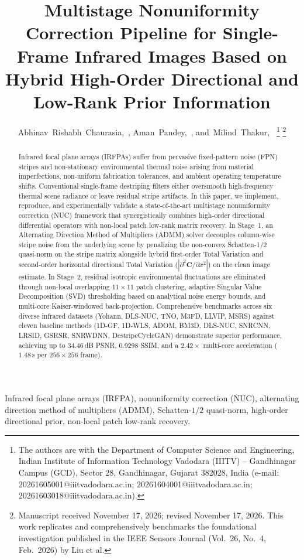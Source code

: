 \documentclass[journal]{IEEEtran}
\title{Multistage Nonuniformity Correction Pipeline for Single-Frame Infrared Images Based on Hybrid High-Order Directional and Low-Rank Prior Information}
\author{Abhinav~Rishabh~Chaurasia,~\IEEEmembership{Student Member,~IEEE},
        Aman~Pandey,~\IEEEmembership{Student Member,~IEEE},
        and~Milind~Thakur,~\IEEEmembership{Student Member,~IEEE}%
\thanks{The authors are with the Department of Computer Science and Engineering, Indian Institute of Information Technology Vadodara (IIITV) -- Gandhinagar Campus (GCD), Sector 28, Gandhinagar, Gujarat 382028, India (e-mail: 20261605001@iiitvadodara.ac.in; 20261604001@iiitvadodara.ac.in; 20261603018@iiitvadodara.ac.in).}%
\thanks{Manuscript received November 17, 2026; revised November 17, 2026. This work replicates and comprehensively benchmarks the foundational investigation published in the IEEE Sensors Journal (Vol.~26, No.~4, Feb.~2026) by Liu et al.}}
\begin{document}
\maketitle

\begin{abstract}
Infrared focal plane arrays (IRFPAs) suffer from pervasive fixed-pattern noise (FPN) stripes and non-stationary environmental thermal noise arising from material imperfections, non-uniform fabrication tolerances, and ambient operating temperature shifts. Conventional single-frame destriping filters either oversmooth high-frequency thermal scene radiance or leave residual stripe artifacts. In this paper, we implement, reproduce, and experimentally validate a state-of-the-art multistage nonuniformity correction (NUC) framework that synergistically combines high-order directional differential operators with non-local patch low-rank matrix recovery. In Stage~1, an Alternating Direction Method of Multipliers (ADMM) solver decouples column-wise stripe noise from the underlying scene by penalizing the non-convex Schatten-1/2 quasi-norm on the stripe matrix alongside hybrid first-order Total Variation and second-order horizontal directional Total Variation ($|\partial^2 \mathbf{C}/\partial x^2|$) on the clean image estimate. In Stage~2, residual isotropic environmental fluctuations are eliminated through non-local overlapping $11 \times 11$ patch clustering, adaptive Singular Value Decomposition (SVD) thresholding based on analytical noise energy bounds, and multi-core Kaiser-windowed back-projection. Comprehensive benchmarks across six diverse infrared datasets (Yohann, DLS-NUC, TNO, M3FD, LLVIP, MSRS) against eleven baseline methods (1D-GF, 1D-WLS, ADOM, BM3D, DLS-NUC, SNRCNN, LRSID, GSRSR, SNRWDNN, DestripeCycleGAN) demonstrate superior performance, achieving up to $34.46$\,dB PSNR, $0.9298$ SSIM, and a $2.42\times$ multi-core acceleration ($1.48$\,s per $256 \times 256$ frame).
\end{abstract}

\begin{IEEEkeywords}
Infrared focal plane arrays (IRFPA), nonuniformity correction (NUC), alternating direction method of multipliers (ADMM), Schatten-$1/2$ quasi-norm, high-order directional prior, non-local patch low-rank recovery.
\end{IEEEkeywords}

\end{document}
